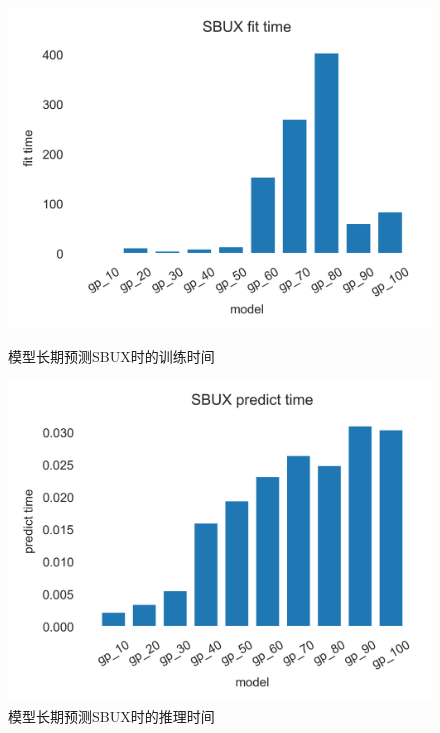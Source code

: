 \begin{figure}[!htbp]
    \centering
    \begin{minipage}[t]{0.49\textwidth}
    \centering
    \includegraphics[width=\textwidth]{images/lab2/SBUX_fit_time.png}
    \caption{模型长期预测SBUX时的训练时间}\label{2SBUXfittime}
    \end{minipage}
    \begin{minipage}[t]{0.49\textwidth}
    \centering
    \includegraphics[width=\textwidth]{images/lab2/SBUX_predict_time.png}
    \caption{模型长期预测SBUX时的推理时间}\label{2SBUXpredicttime}
    \end{minipage}
\end{figure}


